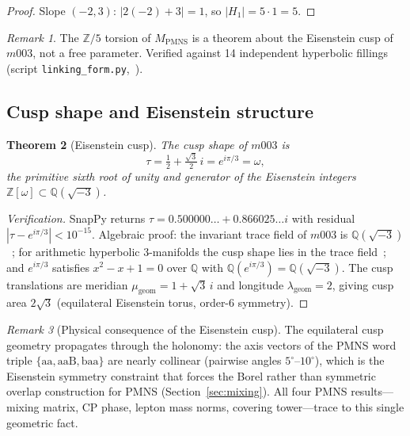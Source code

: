 \documentclass[11pt,a4paper]{article}
\newtheorem{theorem}{Theorem}
\theoremstyle{definition}
\theoremstyle{remark}
\newtheorem{remark}[theorem]{Remark}
\newcommand{\ZZ}{\mathbb{Z}}
\newcommand{\QQ}{\mathbb{Q}}
\newcommand{\MPMNS}{M_{\mathrm{PMNS}}}
\begin{document}
\begin{proof}
Slope $(-2,3)$: $|2(-2)+3| = 1$,
so $|H_1| = 5\cdot1 = 5$.
\end{proof}

\begin{remark}
The $\ZZ/5$ torsion of $\MPMNS$ is a theorem about the Eisenstein
cusp of $m003$, not a free parameter.
Verified against 14 independent hyperbolic fillings
(script \texttt{linking\_form.py},~\cite{GitHub}).
\end{remark}

\subsection{Cusp shape and Eisenstein structure}

\begin{theorem}[Eisenstein cusp]
\label{thm:cusp}
The cusp shape of $m003$ is
\[
  \tau = \tfrac{1}{2}+\tfrac{\sqrt{3}}{2}\,i
       = e^{i\pi/3} = \omega,
\]
the primitive sixth root of unity and generator of the
Eisenstein integers $\ZZ[\omega]\subset\QQ(\sqrt{-3})$.
\end{theorem}

\begin{proof}[Verification]
SnapPy returns $\tau = 0.500000\ldots + 0.866025\ldots i$
with residual $|\tau - e^{i\pi/3}| < 10^{-15}$.
Algebraic proof: the invariant trace field of $m003$ is
$\QQ(\sqrt{-3})$~\cite{Chinburg98}; for arithmetic hyperbolic
3-manifolds the cusp shape lies in the trace field~\cite{MaclachlanReid};
and $e^{i\pi/3}$ satisfies $x^2-x+1=0$ over $\QQ$ with
$\QQ(e^{i\pi/3})=\QQ(\sqrt{-3})$.
The cusp translations are meridian $\mu_\mathrm{geom}=1+\sqrt{3}\,i$
and longitude $\lambda_\mathrm{geom}=2$, giving cusp area $2\sqrt{3}$
(equilateral Eisenstein torus, order-6 symmetry).
\end{proof}

\begin{remark}[Physical consequence of the Eisenstein cusp]
The equilateral cusp geometry propagates through the holonomy:
the axis vectors of the PMNS word triple
$\{\mathrm{aa},\mathrm{aaB},\mathrm{baa}\}$ are nearly collinear
(pairwise angles $5^\circ$--$10^\circ$), which is the Eisenstein
symmetry constraint that forces the Borel rather than symmetric
overlap construction for PMNS (Section~\ref{sec:mixing}).
All four PMNS results---mixing matrix, CP phase, lepton mass
norms, covering tower---trace to this single geometric fact.
\end{remark}
\end{document}
